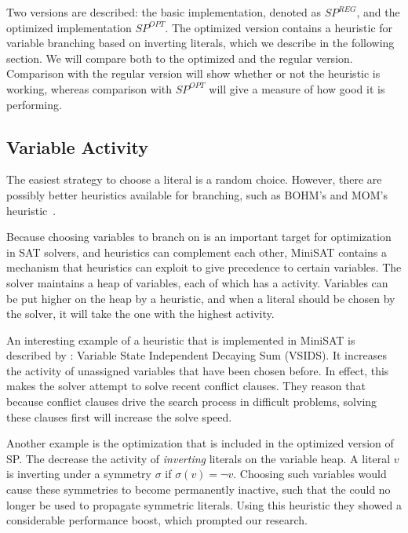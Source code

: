	Two versions are described: the basic implementation, denoted as $SP^{REG}$, and the optimized
	implementation $SP^{OPT}$.
	The optimized version contains a heuristic for variable branching based on inverting literals,
	which we describe in the following section.
	We will compare both to the optimized and the regular version.
	Comparison with the regular version will show whether or not the heuristic is working, whereas
	comparison with $SP^{OPT}$ will give a measure of how good it is performing.

\subsection{Variable Activity}
	The easiest strategy to choose a literal is a random choice.
	However, there are possibly better heuristics available for branching,
	such as BOHM's and MOM's heuristic~\cite{marques1999impact}.

	Because choosing variables to branch on is an important target for optimization in SAT solvers,
	and heuristics can complement each other, MiniSAT contains a mechanism that heuristics can
	exploit to give precedence to certain variables.
	The solver maintains a heap of variables, each of which has a activity.
	Variables can be put higher on the heap by a heuristic, and when a literal should be chosen by
	the solver, it will take the one with the highest activity.

	An interesting example of a heuristic that is implemented in MiniSAT is described by
	\cite{moskewicz2001chaff}: Variable State Independent Decaying Sum (VSIDS).
	It increases the activity of unassigned variables that have been chosen before.
	In effect, this makes the solver attempt to solve recent conflict clauses.
	They reason that because conflict clauses drive the search process in difficult problems,
	solving these clauses first will increase the solve speed.

	Another example is the optimization that is included in the optimized version of SP.
	The decrease the activity of \emph{inverting} literals on the variable heap.
	A literal $v$ is inverting under a symmetry $\sigma$ if $\sigma(v) = \neg v$.
	Choosing such variables would cause these symmetries to become permanently inactive, such that
	the could no longer be used to propagate symmetric literals.
	Using this heuristic they showed a considerable performance boost, which prompted our research.
